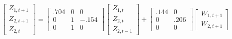 \documentclass[12pt]{article}
\theoremstyle{definition}
\theoremstyle{remark}
\begin{document}
\begin{equation*}
\begin{bmatrix}Z_{1,t+1}\\Z_{2,t+1}\\Z_{2,t}\end{bmatrix} = \begin{bmatrix}.704 & 0 & 0 \\0 & 1 & -.154\\ 0 & 1 & 0\end{bmatrix} \begin{bmatrix}Z_{1,t}\\Z_{2,t}\\Z_{2,t-1}\end{bmatrix} + \begin{bmatrix}.144 & 0 \\0 & .206 \\ 0 & 0\end{bmatrix} \begin{bmatrix} W_{1,t+1}\\ W_{2,t+1}\end{bmatrix}
\end{equation*}
%
%
\end{document}
